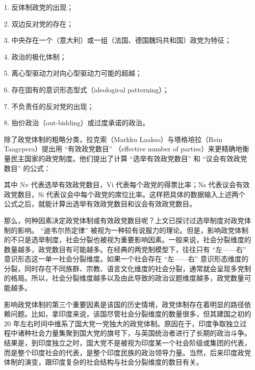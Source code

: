 1. 反体制政党的出现；

2. 双边反对党的存在；

3. 中央存在一个（意大利）或一组（法国、德国魏玛共和国）政党为特征；

4. 政治的极化体制；

5. 离心型驱动力对向心型驱动力可能的超越；

6. 存在固有的意识形态型式（ideological patterning）；

7. 不负责任的反对党的出现；

8. 抬价政治（out-bidding）或过度承诺的政治。

除了政党体制的粗略分类，拉克索（Markku Laakso）与塔格培拉（Rein Taagcpera）提出用 “有效政党数目” （effective number of parties）来更精确地衡量民主国家的政党制度。他们提出了计算 “选举有效政党数目” 和 “议会有效政党数目” 的公式：


其中 Nv 代表选举有效政党数目，Vi 代表每个政党的得票比率；Ns 代表议会有效政党数目，Si 代表议会中每个政党的席位比率。这样把具体的数据输入上述两个公式之后，就能计算出选举有效政党数目和议会有效政党数目。

那么，何种因素决定政党体制或有效政党数目呢？上文已探讨过选举制度对政党体制的影响。 “迪韦尔热定律” 被视为一种较有说服力的理论。但是，影响政党体制的不只是选举制度，社会分裂也被视为重要影响因素。一般来说，社会分裂维度的数量越多，政党数目有可能越多。在经典的两党制模型下，往往只有 “左——右” 意识形态这一单一社会分裂维度。如果一个社会存在 “左——右” 意识形态维度的分裂，同时存在不同族群、宗教、语言文化维度的社会分裂，通常就会呈现多党制的格局。所以，社会分裂维度越多以及由此导致的政治议题维度越多，政党数量可能越多。

影响政党体制的第三个重要因素是该国的历史情境，政党体制存在着明显的路径依赖问题。比如，拿印度来说，该国尽管社会分裂维度的数量很多，但其建国之初的 20 年左右时间中维系了国大党一党独大的政党体制。原因在于，印度争取独立过程中诸种社会力量集聚到国大党的旗号下，与英国统治者进行了长期的政治斗争。结果是，到印度独立之时，国大党不是被视为印度某一个社会阶级或集团的代表，而是整个印度社会的代表，是整个印度民族的政治领导力量。当然，后来印度政党体制的演变，跟印度复杂的社会结构与社会分裂维度的数目有关。

